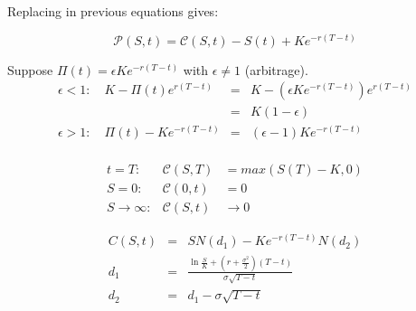 Replacing in previous equations gives:

\begin{equation*}
    \mathcal{P}(S,t) = \mathcal{C}(S,t) - S(t) + Ke^{-r(T-t)}
\end{equation*}

Suppose $\mathit{\Pi}(t) = \epsilon Ke^{-r(T-t)}$ with $\epsilon \neq 1$ (arbitrage).
\begin{eqnarray*}
    \epsilon < 1 : \quad K - \mathit{\Pi(t)}e^{r(T-t)} &=& K - (\epsilon Ke^{-r(T-t)})e^{r(T-t)} \\
                                  &=& K(1-\epsilon)\\
    \epsilon > 1 : \quad \mathit{\Pi}(t) - Ke^{-r(T-t)} &=& (\epsilon - 1)Ke^{-r(T-t)}\\
\end{eqnarray*}

\begin{eqnarray*}
    t = T:& \mathcal{C}(S, T) &= max\left(S(T) - K, 0 \right) \\
    S = 0:& \mathcal{C}(0, t) &= 0 \\
    S \xrightarrow{} \infty :& \mathcal{C}(S, t) &\xrightarrow{} 0
\end{eqnarray*}


\begin{eqnarray*}
    C(S, t) &=& S N(d_1) - K e^{-r\left( T-t \right)} N(d_2) \\
    d_1 &=& \frac{\ln \frac{S}{K} + \left( r + \frac{\sigma^2}{2} \right) \left( T - t \right)}{\sigma \sqrt{T - t}} \\
    d_2 &=& d_1 - \sigma \sqrt{T - t} \\
\end{eqnarray*}
